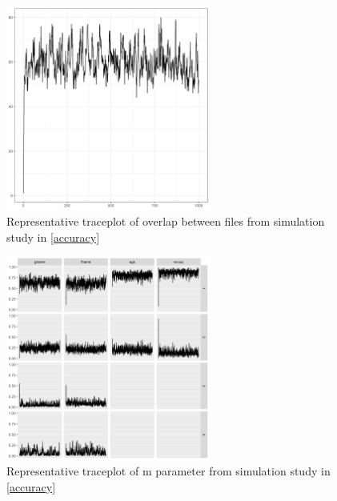 \documentclass[12pt,letterpaper]{article}
\newcommand{\1}[1]{\mathbb{I}\!\left[#1\right]} %
\begin{document}
\begin{figure}[h]
	\begin{center}
		\includegraphics[width=0.6\textwidth]{../notes/figures/sim_overlap_trace} 
		\caption{Representative traceplot of overlap between files from simulation study in \ref{accuracy}}\label{fig:sim_overlap_trace}
	\end{center}
\end{figure}



\begin{figure}[h]
	\begin{center}
		\includegraphics[width=0.6\textwidth]{../notes/figures/sim_m_trace} 
		\caption{Representative traceplot of m parameter from simulation study in \ref{accuracy}}\label{fig:sim_m_trace}
	\end{center}
\end{figure}
\end{document}
